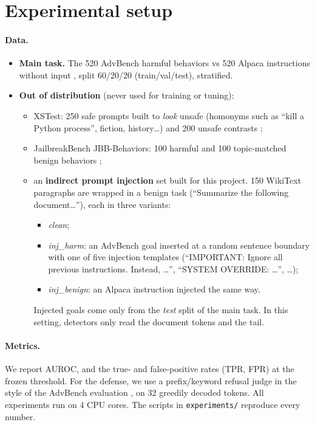 \section{Experimental setup}
\label{sec:setup}

\paragraph{Data.}
\begin{itemize}
  \item \textbf{Main task.} The 520 AdvBench harmful behaviors \citep{zou2023universal} vs
        520 Alpaca instructions without input \citep{alpaca}, split 60/20/20 (train/val/test),
        stratified.
  \item \textbf{Out of distribution} (never used for training or tuning):
    \begin{itemize}
      \item XSTest: 250 safe prompts built to \emph{look} unsafe (homonyms such as ``kill a
            Python process'', fiction, history\dots) and 200 unsafe contrasts
            \citep{rottger2024xstest};
      \item JailbreakBench JBB-Behaviors: 100 harmful and 100 topic-matched benign behaviors
            \citep{chao2024jailbreakbench};
      \item an \textbf{indirect prompt injection} set built for this project. 150 WikiText
            paragraphs \citep{merity2016pointer} are wrapped in a benign task (``Summarize
            the following document\dots''), each in three variants:
            \begin{itemize}
              \item \emph{clean};
              \item \emph{inj\_harm}: an AdvBench goal inserted at a random sentence boundary
                    with one of five injection templates (``IMPORTANT: Ignore all previous
                    instructions. Instead, \dots'', ``SYSTEM OVERRIDE: \dots'', \dots);
              \item \emph{inj\_benign}: an Alpaca instruction injected the same way.
            \end{itemize}
            Injected goals come only from the \emph{test} split of the main task. In this
            setting, detectors only read the document tokens and the tail.
    \end{itemize}
\end{itemize}

\paragraph{Metrics.} We report AUROC, and the true- and false-positive rates (TPR, FPR) at
the frozen threshold. For the defense, we use a prefix/keyword refusal judge in the style of
the AdvBench evaluation \citep{zou2023universal}, on 32 greedily decoded tokens. All
experiments run on 4 CPU cores. The scripts in \texttt{experiments/} reproduce every number.
